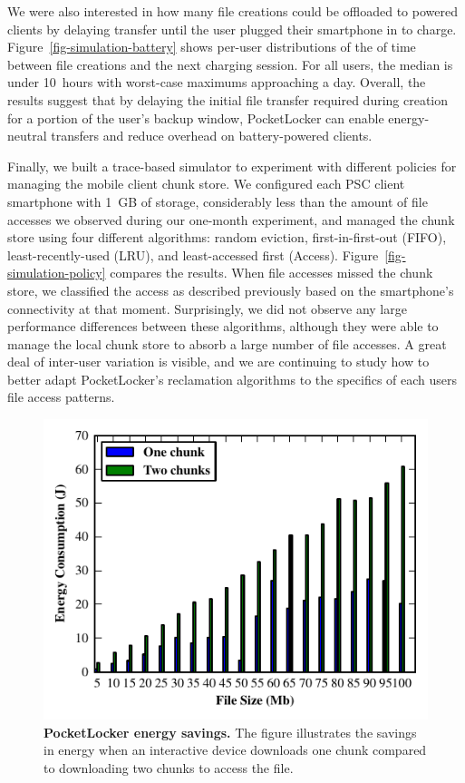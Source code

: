 We were also interested in how many file creations could be offloaded to
powered clients by delaying transfer until the user plugged their smartphone
in to charge. Figure~\ref{fig-simulation-battery} shows per-user
distributions of the of time between file creations and the next charging
session. For all users, the median is under 10~hours with worst-case maximums
approaching a day. Overall, the results suggest that by delaying the initial
file transfer required during creation for a portion of the user's backup
window, PocketLocker can enable energy-neutral transfers and reduce overhead
on battery-powered clients.


Finally, we built a trace-based simulator to experiment with different
policies for managing the mobile client chunk store. We configured each PSC
client smartphone with 1~GB of storage, considerably less than the amount of
file accesses we observed during our one-month experiment, and managed the
chunk store using four different algorithms: random eviction,
first-in-first-out (FIFO), least-recently-used (LRU), and least-accessed
first (Access). Figure~\ref{fig-simulation-policy} compares the results. When
file accesses missed the chunk store, we classified the access as described
previously based on the smartphone's connectivity at that moment.
Surprisingly, we did not observe any large performance differences between
these algorithms, although they were able to manage the local
chunk store to absorb a large number of file accesses. A great
deal of inter-user variation is visible, and we are continuing to study
how to better adapt PocketLocker's reclamation algorithms to the specifics of
each users file access patterns.
\begin{figure}[t]
  
  \includegraphics[scale=.97]{./figures/energysavings.pdf}
  
  \caption{\small \textbf{PocketLocker energy savings.} The figure
    illustrates the savings in energy when an interactive device downloads
  one chunk compared to downloading two chunks to access the file.}
  
  \label{fig-evaluation-energysavings}

  \vspace*{-0.2in}
\end{figure}

